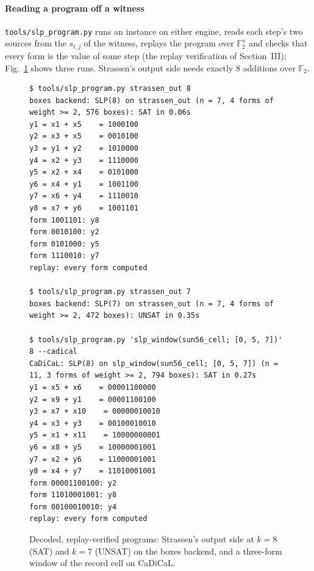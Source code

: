 \documentclass[conference]{IEEEtran}
\providecommand{\F}{\mathbb{F}_2}
\begin{document}
\paragraph{Reading a program off a witness}
\texttt{tools/slp\_program.py} runs an instance on either engine, reads
each step's two sources from the $s_{t,j}$ of the witness, replays the
program over $\F^n$ and checks that every form is the value of some step
(the replay verification of Section~III); Fig.~\ref{fig:slp} shows three
runs. Strassen's output side needs exactly 8 additions over $\F$.

\begin{figure}[!t]
\scriptsize
\begin{verbatim}
$ tools/slp_program.py strassen_out 8
boxes backend: SLP(8) on strassen_out (n = 7, 4 forms of weight >= 2, 576 boxes): SAT in 0.06s
y1 = x1 + x5    = 1000100
y2 = x3 + x5    = 0010100
y3 = y1 + y2    = 1010000
y4 = x2 + y3    = 1110000
y5 = x2 + x4    = 0101000
y6 = x4 + y1    = 1001100
y7 = x6 + y4    = 1110010
y8 = x7 + y6    = 1001101
form 1001101: y8
form 0010100: y2
form 0101000: y5
form 1110010: y7
replay: every form computed

$ tools/slp_program.py strassen_out 7
boxes backend: SLP(7) on strassen_out (n = 7, 4 forms of weight >= 2, 472 boxes): UNSAT in 0.35s

$ tools/slp_program.py 'slp_window(sun56_cell; [0, 5, 7])' 8 --cadical
CaDiCaL: SLP(8) on slp_window(sun56_cell; [0, 5, 7]) (n = 11, 3 forms of weight >= 2, 794 boxes): SAT in 0.27s
y1 = x5 + x6    = 00001100000
y2 = x9 + y1    = 00001100100
y3 = x7 + x10    = 00000010010
y4 = x3 + y3    = 00100010010
y5 = x1 + x11    = 10000000001
y6 = x8 + y5    = 10000001001
y7 = x2 + y6    = 11000001001
y8 = x4 + y7    = 11010001001
form 00001100100: y2
form 11010001001: y8
form 00100010010: y4
replay: every form computed
\end{verbatim}
\caption{Decoded, replay-verified programs: Strassen's output side at
$k=8$ (SAT) and $k=7$ (UNSAT) on the boxes backend, and a three-form window
of the record cell on CaDiCaL.}
\label{fig:slp}
\end{figure}
\end{document}
